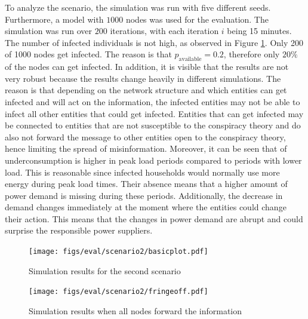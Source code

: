To analyze the scenario, the simulation was run with five 
different seeds. Furthermore, a model with $1000$ nodes was used 
for the evaluation. 
The simulation was run over $200$ iterations, with each
iteration $i$ being 15 minutes.
The number of infected individuals 
is not high, as observed in Figure \ref{schwurblerresults}.
Only 200 of 1000 nodes get infected. The reason is 
that $p_{\mathrm{available}}=0.2$, therefore only $20\%$ of the nodes
can get infected. In addition, it is visible that the results 
are not very robust because the results change heavily in different 
simulations. The reason is that depending on the network structure
and which entities can get infected and will act on the information, 
the infected entities may not be able to infect all other entities
that could get infected. Entities that can get infected may be 
connected to entities that are not susceptible to the conspiracy 
theory and do also not forward the message to other entities
open to the conspiracy theory, hence limiting the 
spread of misinformation.
Moreover, it can be seen that of underconsumption
is higher in peak load periods compared to periods with 
lower load. This is reasonable since infected households would 
normally use more energy during peak load times. Their absence
means that a higher amount of power demand is missing 
during these periods. Additionally, the decrease in demand 
changes immediately at the moment where the entities 
could change their action. This means that the changes 
in power demand are abrupt and could surprise the responsible 
power suppliers.

\begin{figure}[!ht]
    \center
    \texttt{[image: figs/eval/scenario2/basicplot.pdf]}
    \caption{Simulation results for the second scenario}
    \label{schwurblerresults}
\end{figure}

\begin{figure}[!ht]
    \center
    \texttt{[image: figs/eval/scenario2/fringeoff.pdf]}
    \caption{Simulation results when all nodes forward the information}
    \label{schwurblerresults2}
\end{figure}

